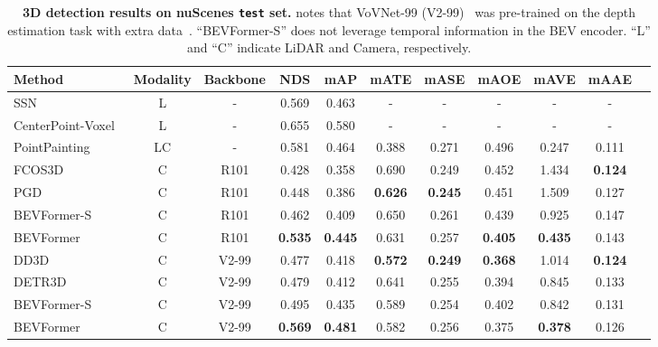\documentclass{article}
\begin{document}
\begin{table}[t]
\begin{center}
\caption{
\textbf{3D detection results on nuScenes \texttt{test} set.}  notes that VoVNet-99 (V2-99)~\cite{lee2019energy} was pre-trained on the depth estimation task with extra data~\cite{park2021pseudo}. ``BEVFormer-S'' does not leverage temporal information in the BEV encoder. ``L'' and ``C'' indicate LiDAR and Camera, respectively.
}

\setlength{\tabcolsep}{0.28mm}
\begin{tabular}{l  c c |c c| c c c c c c }
\toprule
Method &  Modality & Backbone & NDS  & mAP  & mATE     & mASE     & mAOE     & mAVE    & mAAE    \\
\midrule

SSN~\cite{zhu2020ssn} &L &-& 0.569 &0.463 &-&-&-&-&-\\
CenterPoint-Voxel~\cite{yin2021center} & L &-& 0.655 & 0.580  & - &- &- &- &- \\
PointPainting~\cite{vora2020pointpainting}& LC&-&0.581 &0.464 &0.388&0.271&0.496&0.247&0.111\\
\midrule

FCOS3D~\cite{wang2021fcos3d}  & C  & R101& 0.428 &0.358& 0.690& 0.249& 0.452& 1.434 &\textbf{0.124} \\
PGD~\cite{wang2022probabilistic}  & C &  R101&0.448 &0.386& \textbf{0.626}& \textbf{0.245} &0.451 &1.509 &0.127 \\
\rowcolor{gray95}
BEVFormer-S    & C & R101& 0.462& 0.409 & 0.650 & 0.261 & 0.439 & 0.925 & 0.147 \\
\rowcolor{gray9}
BEVFormer    & C & R101& \textbf{0.535}& \textbf{0.445} & 0.631 & 0.257 & \textbf{0.405} & \textbf{0.435} & 0.143 \\
\midrule
DD3D~\cite{park2021pseudo}  & C &V2-99& 0.477 &0.418& \textbf{0.572} & \textbf{0.249} &\textbf{0.368} &1.014 &\textbf{0.124} \\

DETR3D~\cite{wang2022detr3d}  & C &  V2-99& 0.479 & 0.412 &0.641& 0.255 &0.394 &0.845& 0.133\\
\rowcolor{gray95}
BEVFormer-S& C &V2-99 & 0.495& 0.435 & 0.589&0.254 & 0.402 &0.842 & 0.131 \\
\rowcolor{gray9}
BEVFormer& C &V2-99 & \textbf{0.569}& \textbf{0.481} & 0.582&0.256 & 0.375 & \textbf{0.378} & 0.126 \\

\bottomrule
\end{tabular} \label{main_det}
\end{center}
\end{table}
\end{document}
